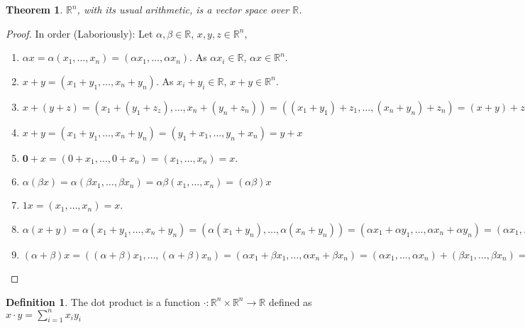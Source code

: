 \documentclass[oneside]{book}
\newtheorem{theorem}{Theorem}[section]
\theoremstyle{definition}
\newtheorem{definition}{Definition}[section]
\newcommand*\B[1]{\mathbf{#1}}
\begin{document}
\begin{theorem}
$\mathbb{R}^n$, with its usual arithmetic, is a vector space over $\mathbb{R}$.
\end{theorem}
\begin{proof}
In order (Laboriously): Let $\alpha, \beta \in \mathbb{R}$, $x,y,z\in \mathbb{R}^n$,
\begin{enumerate}
\item $\alpha x = \alpha(x_1,\hdots,x_n) = (\alpha x_1,\hdots, \alpha x_n)$. As $\alpha x_i \in \mathbb{R}$, $\alpha x \in \mathbb{R}^n$.
\item $x+y = (x_1+y_1,\hdots,x_n+y_n)$. As $x_i+y_i \in \mathbb{R}$, $x+y\in \mathbb{R}^n$.
\item $x+(y+z) = (x_1+(y_1+z_z),\hdots, x_n+(y_n+z_n)) = ((x_1+y_1)+z_1,\hdots, (x_n+y_n)+z_n) = (x+y)+z$
\item $x+y = (x_1+y_1,\hdots,x_n+y_n) = (y_1+x_1,\hdots, y_n+x_n)=y+x$
\item $\B{0}+x = (0+x_1,\hdots, 0+x_n) = (x_1,\hdots, x_n) = x$.
\item $\alpha(\beta x) = \alpha(\beta x_1,\hdots, \beta x_n) = \alpha \beta (x_1,\hdots, x_n) = (\alpha \beta) x$
\item $1 x = (x_1,\hdots, x_n) = x$.
\item $\alpha(x+y) = \alpha(x_1+y_1,\hdots, x_n+y_n) = (\alpha(x_1+y_n),\hdots, \alpha(x_n+y_n)) = (\alpha x_1+\alpha y_1,\hdots, \alpha x_n + \alpha y_n) = (\alpha x_1, \hdots, \alpha x_n) + (\alpha y_1,\hdots, \alpha y_n) = \alpha (x_1,\hdots, x_n)+\alpha(y_1,\hdots, y_n) = \alpha x + \alpha y$ 
\item $(\alpha + \beta)x = ((\alpha+\beta)x_1,\hdots, (\alpha+\beta)x_n) = (\alpha x_1 + \beta x_1,\hdots, \alpha x_n + \beta x_n) = (\alpha x_1,\hdots, \alpha x_n) + (\beta x_1,\hdots, \beta x_n) = \alpha (x_1, \hdots, x_n)+\beta (x_1, \hdots, x_n) = \alpha x+\beta x$
\end{enumerate}
\end{proof}

\begin{definition}
The dot product is a function $\cdot:\mathbb{R}^n \times \mathbb{R}^n \rightarrow \mathbb{R}$ defined as $x\cdot y = \sum_{i=1}^{n} x_iy_i$
\end{definition}
\end{document}

